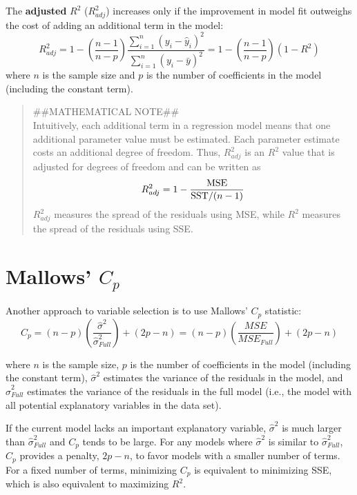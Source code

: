 \documentclass[
]{report}
\begin{document}
The \textbf{adjusted} \(R^2\) (\(R^2_{adj}\)) increases only if the improvement in model fit outweighs the cost of adding an additional term in the model:
\begin{equation}
R^2_{adj} = 1 - \left(\frac{n - 1}{n - p}\right)\frac{\sum_{i=1}^n (y_i - \hat{y}_i)^2}{\sum_{i=1}^n (y_i - \bar{y})^2}
= 1 - \left(\frac{n - 1}{n - p}\right)(1 - R^2)
\tag{3.13}
\end{equation}
where \(n\) is the sample size and \(p\) is the number of coefficients in the model (including the constant term).

\begin{quote}
\#\#MATHEMATICAL NOTE\#\#\\
Intuitively, each additional term in a regression model means that one additional parameter value must be estimated. Each parameter estimate costs an additional degree of freedom. Thus, \(R^2_{adj}\) is an \(R^2\) value that is adjusted for degrees of freedom and can be written as
\begin{equation}
R^2_{adj} = 1 - \frac{\text{MSE}}{\text{SST}/(n - 1)} \notag
\end{equation}
\(R^2_{adj}\) measures the spread of the residuals using MSE, while \(R^2\) measures the spread of the residuals using SSE.
\end{quote}

\section*{\texorpdfstring{Mallows' \(C_p\)}{Mallows' C\_p}}\label{mallows-c_p}

Another approach to variable selection is to use Mallows' \(C_p\) statistic:
\begin{equation}
C_p = (n - p)\left(\frac{\hat{\sigma}^2}{\hat{\sigma}^2_{Full}}\right) + (2p - n)
= (n - p)\left(\frac{MSE}{MSE_{Full}}\right) + (2p - n)
\tag{3.14}
\end{equation}

where \(n\) is the sample size, \(p\) is the number of coefficients in the model (including the constant term), \(\hat{\sigma}^2\) estimates the variance of the residuals in the model, and \(\hat{\sigma}^2_{Full}\) estimates the variance of the residuals in the full model (i.e., the model with all potential explanatory variables in the data set).

If the current model lacks an important explanatory variable, \(\hat{\sigma}^2\) is much larger than \(\hat{\sigma}^2_{Full}\) and \(C_p\) tends to be large. For any models where \(\hat{\sigma}^2\) is similar to \(\hat{\sigma}^2_{Full}\), \(C_p\) provides a penalty, \(2p - n\), to favor models with a smaller number of terms. For a fixed number of terms, minimizing \(C_p\) is equivalent to minimizing SSE, which is also equivalent to maximizing \(R^2\).
\end{document}
